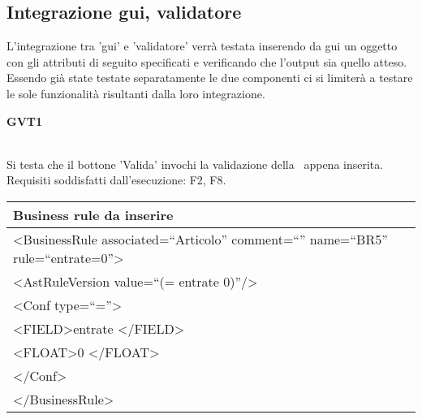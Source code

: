 \subsection{Integrazione gui, validatore}
L'integrazione tra 'gui' e 'validatore' verr\`a testata inserendo da gui  un oggetto \textit{\br\ } con gli attributi di seguito specificati e verificando che l'output sia quello atteso. Essendo gi\`a state testate separatamente le due componenti ci si limiter\`a a testare le sole funzionalit\`a risultanti dalla loro integrazione.\\

\begin{Large}\textbf{GVT1}\end{Large} \\
Si testa che il bottone 'Valida' invochi la validazione della \br\ appena inserita.
Requisiti soddisfatti dall'esecuzione: F2, F8.\\
\begin{center}
\begin{tabular}{|p{11cm}|} \hline
\textbf{Business rule da inserire}\\ \hline
\textless BusinessRule associated=``Articolo'' comment=``'' name=``BR5'' rule=``entrate=0''\textgreater \\
\textless AstRuleVersion value=``(= entrate 0)''/\textgreater \\
 \textless Conf type=``=''\textgreater \\
 \textless FIELD\textgreater entrate \textless /FIELD\textgreater \\
 \textless FLOAT\textgreater 0 \textless /FLOAT\textgreater \\
 \textless /Conf\textgreater \\
\textless /BusinessRule\textgreater \\ \hline
\end{tabular} \\
\end{center}


